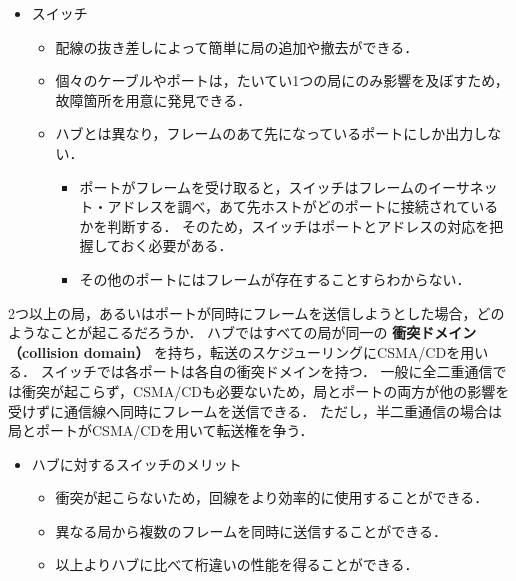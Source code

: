 \documentclass[a4paper]{ltjsarticle}
\begin{document}
\begin{itemize}
\item
  スイッチ

  \begin{itemize}
  \item
    配線の抜き差しによって簡単に局の追加や撤去ができる．
  \item
    個々のケーブルやポートは，たいてい1つの局にのみ影響を及ぼすため，故障箇所を用意に発見できる．
  \item
    ハブとは異なり，フレームのあて先になっているポートにしか出力しない．

    \begin{itemize}
    \item
      ポートがフレームを受け取ると，スイッチはフレームのイーサネット・アドレスを調べ，あて先ホストがどのポートに接続されているかを判断する．
      そのため，スイッチはポートとアドレスの対応を把握しておく必要がある．
    \item
      その他のポートにはフレームが存在することすらわからない．
    \end{itemize}
  \end{itemize}
\end{itemize}

2つ以上の局，あるいはポートが同時にフレームを送信しようとした場合，どのようなことが起こるだろうか．
ハブではすべての局が同一の \textbf{衝突ドメイン（collision domain）}
を持ち，転送のスケジューリングにCSMA/CDを用いる．
スイッチでは各ポートは各自の衝突ドメインを持つ．
一般に全二重通信では衝突が起こらず，CSMA/CDも必要ないため，局とポートの両方が他の影響を受けずに通信線へ同時にフレームを送信できる．
ただし，半二重通信の場合は局とポートがCSMA/CDを用いて転送権を争う．

\begin{itemize}
\item
  ハブに対するスイッチのメリット

  \begin{itemize}
  \item
    衝突が起こらないため，回線をより効率的に使用することができる．
  \item
    異なる局から複数のフレームを同時に送信することができる．
  \item
    以上よりハブに比べて桁違いの性能を得ることができる．
  \end{itemize}
\end{itemize}
\end{document}
